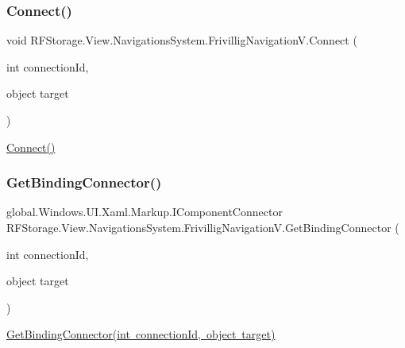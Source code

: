\subsubsection{\texorpdfstring{Connect()}{Connect()}}
{\footnotesize\ttfamily void R\+F\+Storage.\+View.\+Navigations\+System.\+Frivillig\+Navigation\+V.\+Connect (\begin{DoxyParamCaption}\item[{int}]{connection\+Id,  }\item[{object}]{target }\end{DoxyParamCaption})}



\mbox{\hyperlink{class_r_f_storage_1_1_view_1_1_navigations_system_1_1_frivillig_navigation_v_ac3a813ebf5a51d622e1af48d9b56f985}{Connect()}} 

\mbox{\label{class_r_f_storage_1_1_view_1_1_navigations_system_1_1_frivillig_navigation_v_a626571808844d30fcc010bebf2646f6f}} 
\subsubsection{\texorpdfstring{GetBindingConnector()}{GetBindingConnector()}}
{\footnotesize\ttfamily global.\+Windows.\+U\+I.\+Xaml.\+Markup.\+I\+Component\+Connector R\+F\+Storage.\+View.\+Navigations\+System.\+Frivillig\+Navigation\+V.\+Get\+Binding\+Connector (\begin{DoxyParamCaption}\item[{int}]{connection\+Id,  }\item[{object}]{target }\end{DoxyParamCaption})}



\mbox{\hyperlink{class_r_f_storage_1_1_view_1_1_navigations_system_1_1_frivillig_navigation_v_a626571808844d30fcc010bebf2646f6f}{Get\+Binding\+Connector(int connection\+Id, object target)}} 

\mbox{\label{class_r_f_storage_1_1_view_1_1_navigations_system_1_1_frivillig_navigation_v_adc03717682e42aa1db69b9829f8d0927}} 

